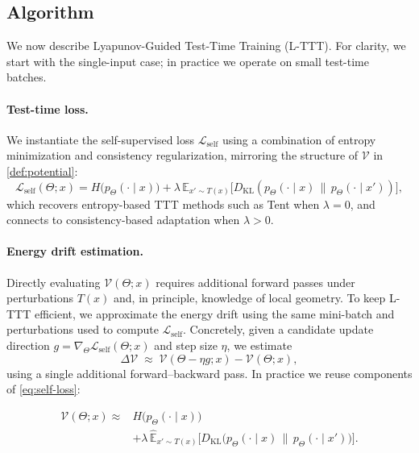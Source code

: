 \documentclass{article}
\theoremstyle{plain}
\theoremstyle{definition}
\theoremstyle{remark}
\newcommand{\E}{\mathbb{E}}
\newcommand{\Lyap}{\mathcal{V}}            %
\begin{document}
\subsection{Algorithm}

We now describe Lyapunov-Guided Test-Time Training (L-TTT). For clarity, we start with the single-input case; in practice we operate on small test-time batches.

\paragraph{Test-time loss.}
We instantiate the self-supervised loss $\mathcal{L}_{\text{self}}$ using a combination of entropy minimization and consistency regularization, mirroring the structure of $\Lyap$ in \eqref{def:potential}:
\begin{equation}
    \mathcal{L}_{\text{self}}(\Theta; x)
    =
    H\big(p_{\Theta}(\cdot \mid x)\big)
    +
    \lambda \, \E_{x' \sim T(x)}
    \big[
        D_{\mathrm{KL}}\!\left(
            p_{\Theta}(\cdot \mid x)
            \,\big\|\,
            p_{\Theta}(\cdot \mid x')
        \right)
    \big],
    \label{eq:self-loss}
\end{equation}
which recovers entropy-based TTT methods such as Tent \cite{wang2021tent} when $\lambda=0$, and connects to consistency-based adaptation \cite{sohn2020fixmatch,zhai2019s4l,zhang2024surveytta} when $\lambda>0$.

\paragraph{Energy drift estimation.}
Directly evaluating $\Lyap(\Theta; x)$ requires additional forward passes under perturbations $T(x)$ and, in principle, knowledge of local geometry. To keep L-TTT efficient, we approximate the energy drift using the same mini-batch and perturbations used to compute $\mathcal{L}_{\text{self}}$. Concretely, given a candidate update direction $g = \nabla_{\Theta} \mathcal{L}_{\text{self}}(\Theta; x)$ and step size $\eta$, we estimate
\begin{equation}
    \Delta \Lyap
    \;\approx\;
    \Lyap(\Theta - \eta g; x)
    -
    \Lyap(\Theta; x),
\end{equation}
using a single additional forward–backward pass. In practice we reuse components of \eqref{eq:self-loss}:

\begin{equation}
\begin{aligned}
\Lyap(\Theta; x)
\approx {} & H\big(p_{\Theta}(\cdot \mid x)\big) \\
& +
\lambda \, \hat{\E}_{x' \sim T(x)}
\Big[
  D_{\mathrm{KL}\!}\big(
    p_{\Theta}(\cdot \mid x)
    \,\big\|\,
    p_{\Theta}(\cdot \mid x')
  \big)
\Big].
\end{aligned}
\end{equation}
\end{document}
